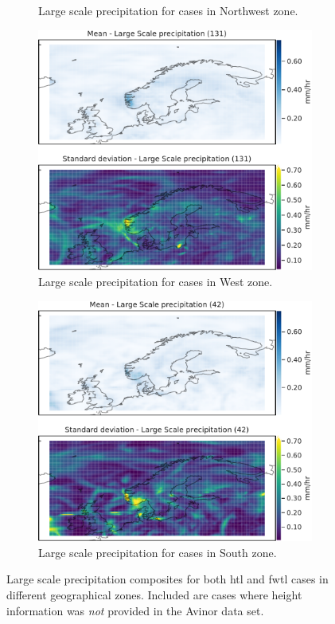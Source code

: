 \begin{figure}[H]
\begin{subfigure}[b]{0.49\textwidth}
    \caption{Large scale precipitation for cases in Northwest zone.}
    \label{fig:NordWestlsP}
\end{subfigure}
\begin{subfigure}[b]{0.49\textwidth}
    \centering
    \includegraphics[width=\textwidth]{Figures/lsPVest.pdf}
    \caption{Large scale precipitation for cases in West zone.}
    \label{fig:WestlsP}
\end{subfigure}
\begin{subfigure}[b]{0.49\textwidth}
    \centering
    \includegraphics[width=\textwidth]{Figures/lsPSor.pdf}
    \caption{Large scale precipitation for cases in South zone.}
    \label{fig:SouthlsP}
\end{subfigure}
\caption{Large scale precipitation composites for both \acrshort{htl} and \acrshort{fwtl} cases in different geographical zones. Included are cases where height information was \textit{not} provided in the Avinor data set.}
\label{fig:largescalezones}
\end{figure}

